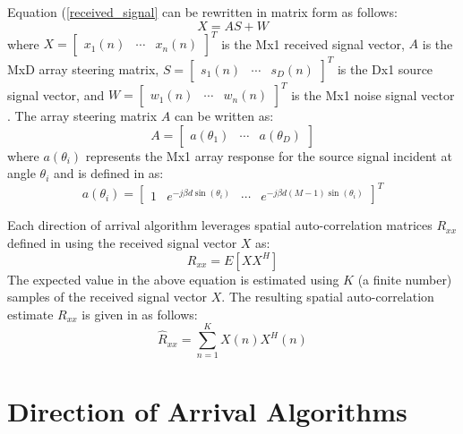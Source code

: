 \documentclass[conference]{IEEEtran}
\begin{document}
	Equation (\ref{received_signal} can be rewritten in matrix form as follows:
	\begin{equation}
		X = AS + W
	\end{equation}
	where $X = \begin{bmatrix} x_1(n) & \cdots & x_n(n)\end{bmatrix}^T$ is the Mx1 received signal vector, $A$ is the MxD array steering matrix, $S = \begin{bmatrix} s_1(n) & \cdots & s_D(n)\end{bmatrix}^T$ is the Dx1 source signal vector, and $W = \begin{bmatrix} w_1(n) & \cdots & w_n(n)\end{bmatrix}^T$ is the Mx1 noise signal vector \cite{doa_algorithms_raghu}. The array steering matrix $A$ can be written as:
	\begin{equation}
		A = \begin{bmatrix} a(\theta_1) & \cdots & a(\theta_D) \end{bmatrix}
	\end{equation}
	where $a(\theta_i)$ represents the Mx1 array response for the source signal incident at angle $\theta_i$ and is defined in \cite{doa_algorithms_raghu} as:
	\begin{equation}
		\label{array_response_vector}
	 	a(\theta_i) = \begin{bmatrix} 1 & e^{-j{\beta}d\sin(\theta_i)} & \cdots & e^{-j{\beta}d(M-1)\sin(\theta_i)}\end{bmatrix}^T
	\end{equation}
	
		Each direction of arrival algorithm leverages spatial auto-correlation matrices $R_{xx}$ defined in \cite{doa_algorithms_raghu}  using the received signal vector $X$ as:
	\begin{equation}
		R_{xx} = E[XX^H]
	\end{equation}
	The expected value in the above equation is estimated using $K$ (a finite number) samples of the received signal vector $X$. The resulting spatial auto-correlation estimate ${R}_{xx}$ is given in \cite{doa_algorithms_raghu} as follows: 
	\begin{equation}
		\label{spatial_matrix_estimate}
		\hat{R}_{xx} = \sum_{n=1}^{K}{X(n)X^H(n)}
	\end{equation}
	
	\section{Direction of Arrival Algorithms}
	
\end{document}
